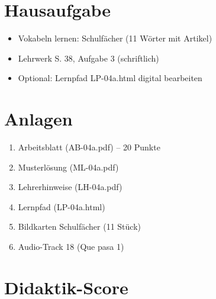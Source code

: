 \documentclass[11pt,a4paper]{article}
\begin{document}
\section{Hausaufgabe}

\begin{itemize}
    \item Vokabeln lernen: Schulfächer (11 Wörter mit Artikel)
    \item Lehrwerk S. 38, Aufgabe 3 (schriftlich)
    \item Optional: Lernpfad LP-04a.html digital bearbeiten
\end{itemize}

\section{Anlagen}

\begin{enumerate}
    \item Arbeitsblatt (AB-04a.pdf) -- 20 Punkte
    \item Musterlösung (ML-04a.pdf)
    \item Lehrerhinweise (LH-04a.pdf)
    \item Lernpfad (LP-04a.html)
    \item Bildkarten Schulfächer (11 Stück)
    \item Audio-Track 18 (Que pasa 1)
\end{enumerate}

\newpage
\section{Didaktik-Score}
\end{document}
